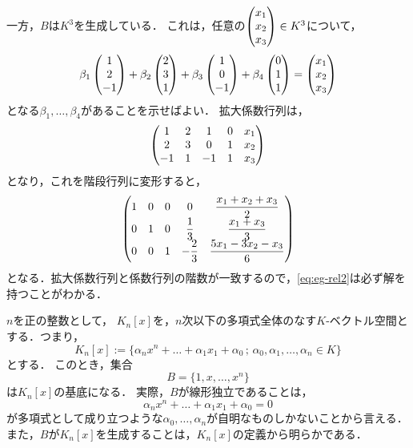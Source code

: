 \begin{example}
    一方，$B$は$K^3$を生成している．
    これは，任意の$\begin{pmatrix} x_1 \\ x_2 \\ x_3 \end{pmatrix} \in K^3$について，
    \begin{equation}\label{eq:eg-rel2}
        \beta_1 \begin{pmatrix} 1 \\ 2 \\ -1 \end{pmatrix} + \beta_2 \begin{pmatrix} 2 \\ 3 \\ 1 \end{pmatrix} + \beta_3 \begin{pmatrix} 1 \\ 0 \\ -1 \end{pmatrix} + \beta_4 \begin{pmatrix} 0 \\ 1 \\ 1 \end{pmatrix} = \begin{pmatrix} x_1 \\ x_2 \\ x_3 \end{pmatrix}
    \end{equation}
    となる$\beta_1,\dots,\beta_4$があることを示せばよい．
    拡大係数行列は，
    \[
        \begin{pmatrix} 1 & 2 & 1 & 0 & x_1 \\ 2 & 3 & 0 & 1 & x_2 \\ -1 & 1 & -1 & 1 & x_3 \end{pmatrix}
    \]
    となり，これを階段行列に変形すると，
    \[
        \begin{pmatrix} 1 & 0 & 0 & 0 & \dfrac{x_1+x_2+x_3}{2} \\ 0 & 1 & 0 & \dfrac{1}{3} & \dfrac{x_1 + x_3}{3} \\ 0 & 0 & 1 & -\dfrac{2}{3} & \dfrac{5x_1 - 3x_2 - x_3}{6} \end{pmatrix}
    \]
    となる．拡大係数行列と係数行列の階数が一致するので，\eqref{eq:eg-rel2}は必ず解を持つことがわかる．
\end{example}
\begin{example}
    $n$を正の整数として，
    $K_n[x]$を，$n$次以下の多項式全体のなす$K$-ベクトル空間とする．つまり，
    \[
        K_n[x] := \{ \alpha_n x^n + \dots + \alpha_1 x_1 + \alpha_0\,;\, \alpha_0,\alpha_1,\dots,\alpha_n \in K \}
    \]
    とする．
    このとき，集合
    \[
        B = \{1,x,\dots,x^n\}
    \]
    は$K_n[x]$の基底になる．
    実際，$B$が線形独立であることは，
    \[
        \alpha_n x^n + \dots + \alpha_1 x_1 + \alpha_0 = 0
    \]
    が多項式として成り立つような$\alpha_0,\dots,\alpha_n$が自明なものしかないことから言える．
    また，$B$が$K_n[x]$を生成することは，$K_n[x]$の定義から明らかである．
\end{example}

